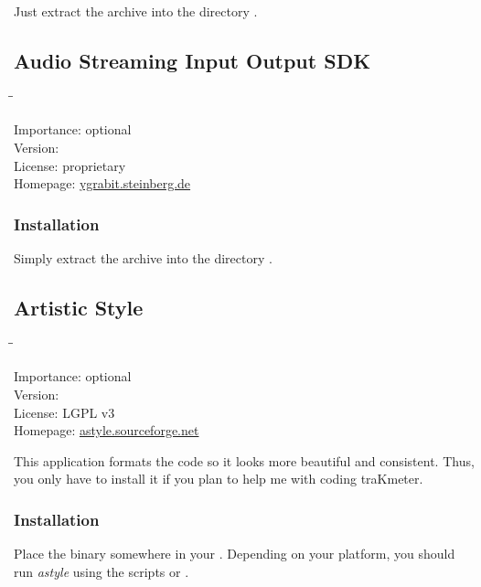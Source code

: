 Just extract the archive into the directory
.

\subsection{Audio Streaming Input Output SDK}

\begin{tabbing}
  \hspace*{6em}\=\=\kill

  Importance:  \> optional \\
  Version:      \\
  License:     \> proprietary \\
  Homepage:    \> \href{http://ygrabit.steinberg.de/}{ygrabit.steinberg.de}
\end{tabbing}

\subsubsection{Installation}

Simply extract the archive into the directory
.

\subsection{Artistic Style}

\begin{tabbing}
  \hspace*{6em}\=\=\kill

  Importance:  \> optional \\
  Version:      \\
  License:     \> LGPL v3 \\
  Homepage:    \> \href{http://astyle.sourceforge.net/}{astyle.sourceforge.net}
\end{tabbing}

This application formats the code so it looks more beautiful and
consistent.  Thus, you only have to install it if you plan to help me
with coding traKmeter.

\subsubsection{Installation}

Place the binary somewhere in your .  Depending on your
platform, you should run \emph{astyle} using the scripts
 or .

